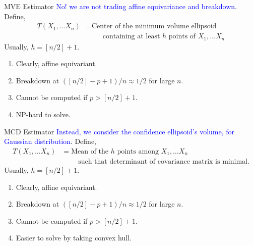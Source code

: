 \documentclass[10pt,xcolor=svgnames]{beamer} %
\begin{document}
\begin{frame}{MVE Estimator}
    \textcolor{blue}{No! we are not trading affine equivariance and breakdown}.\\
    Define,
    \begin{align*}
        T(X_1,\dots X_n) 
        & = \text{Center of the minimum volume ellipsoid }\\
        & \qquad \text{ containing at least } h \text{ points of } X_1, \dots X_n
    \end{align*}
    Usually, $h = [n/2] + 1$.
    \pause
    \begin{enumerate}
        \item Clearly, affine equivariant.
        \item Breakdown at $([n/2]-p+1)/n \approx 1/2$ for large $n$.
        \item Cannot be computed if $p > [n/2]+1$.
        \item NP-hard to solve.
    \end{enumerate}
\end{frame}

\begin{frame}{MCD Estimator}
    \textcolor{blue}{Instead, we consider the confidence ellipsoid's volume, for Gaussian distribution}.
    Define,
    \begin{align*}
        T(X_1,\dots X_n) 
        & = \text{Mean of the } h \text{ points among } X_1, \dots X_n \\
        & \qquad \text{ such that determinant of covariance matrix is minimal}.
    \end{align*}
    Usually, $h = [n/2] + 1$.
    \pause
    \begin{enumerate}
        \item Clearly, affine equivariant.
        \item Breakdown at $([n/2]-p+1)/n \approx 1/2$ for large $n$.
        \item Cannot be computed if $p > [n/2]+1$.
        \item Easier to solve by taking convex hull.
    \end{enumerate}
\end{frame}
\end{document}
